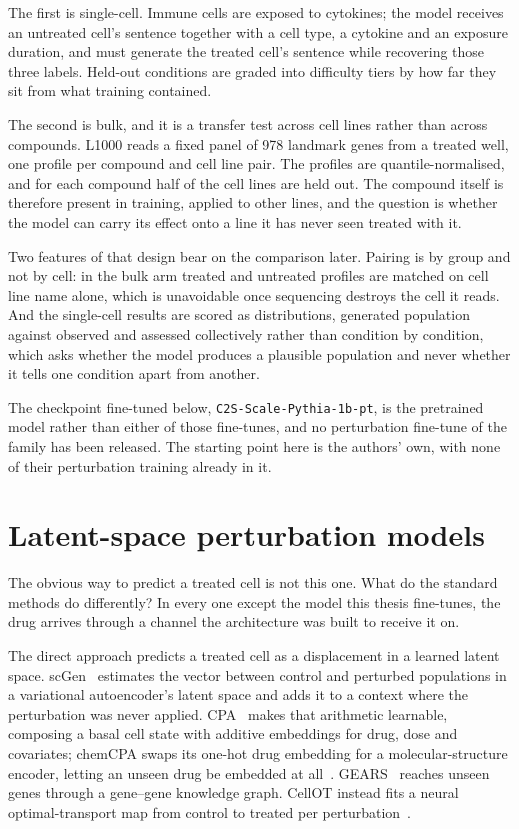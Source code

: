 The first is single-cell. Immune cells are exposed to cytokines; the model
receives an untreated cell's sentence together with a cell type, a cytokine and
an exposure duration, and must generate the treated cell's sentence while
recovering those three labels. Held-out conditions are graded into difficulty
tiers by how far they sit from what training contained.

The second is bulk, and it is a transfer test across cell lines rather than
across compounds. L1000 reads a fixed panel of 978 landmark genes from a
treated well, one profile per compound and cell line pair. The profiles are
quantile-normalised, and for each compound half of the cell lines are held out.
The compound itself is therefore present in training, applied to other lines,
and the question is whether the model can carry its effect onto a line it has
never seen treated with it.

Two features of that design bear on the comparison later. Pairing is by group
and not by cell: in the bulk arm treated and untreated profiles are matched on
cell line name alone, which is unavoidable once sequencing destroys the cell it
reads. And the single-cell results are scored as distributions, generated
population against observed and assessed collectively rather than condition by
condition, which asks whether the model produces a plausible population and
never whether it tells one condition apart from another.

The checkpoint fine-tuned below, \texttt{C2S-Scale-Pythia-1b-pt}, is the
pretrained model rather than either of those fine-tunes, and no perturbation
fine-tune of the family has been released. The starting point here is the
authors' own, with none of their perturbation training already in it.
\section{Latent-space perturbation models}
\label{sec:lit-chem}
\framedecl{-}

\begin{question}
The obvious way to predict a treated cell is not this one. What do the standard
methods do differently? In every one except the model this thesis fine-tunes, the
drug arrives through a channel the architecture was built to receive it on.
\end{question}

\noindent
The direct approach predicts a treated cell as a displacement in a learned
latent space. scGen~\cite{scgen} estimates the vector between control and
perturbed populations in a variational autoencoder's latent space and adds it to
a context where the perturbation was never applied. CPA~\cite{cpa} makes that
arithmetic learnable, composing a basal cell state with additive embeddings for
drug, dose and covariates; chemCPA swaps its one-hot drug embedding for a
molecular-structure encoder, letting an unseen drug be embedded at
all~\cite{chemcpa}. GEARS~\cite{gears}
reaches unseen genes through a gene--gene knowledge graph. CellOT instead fits a
neural optimal-transport map from control to treated per
perturbation~\cite{cellot,conditionalmonge}.


